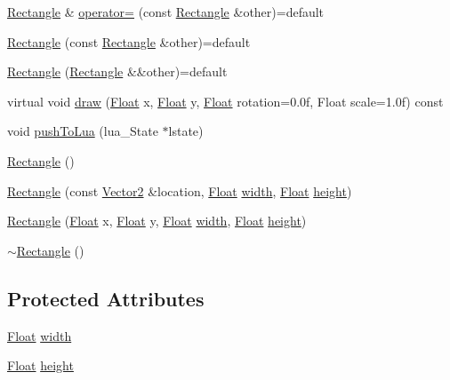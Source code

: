 \begin{DoxyCompactItemize}
\hyperlink{classZeta_1_1Rectangle}{Rectangle} \& \hyperlink{classZeta_1_1Rectangle_a8f621ef5572f32caaaf564f5557e6085}{operator=} (const \hyperlink{classZeta_1_1Rectangle}{Rectangle} \&other)=default
\item 
\hyperlink{classZeta_1_1Rectangle_a6534ea87af2bfb9a8200baeae4701e25}{Rectangle} (const \hyperlink{classZeta_1_1Rectangle}{Rectangle} \&other)=default
\item 
\hyperlink{classZeta_1_1Rectangle_a3da14f013b2eb447d9edfeb259d597bb}{Rectangle} (\hyperlink{classZeta_1_1Rectangle}{Rectangle} \&\&other)=default
\item 
virtual void \hyperlink{classZeta_1_1Rectangle_a2ed6e665e3fd875143cf6bdad95277bb}{draw} (\hyperlink{namespaceZeta_a1e0a1265f9b3bd3075fb0fabd39088ba}{Float} x, \hyperlink{namespaceZeta_a1e0a1265f9b3bd3075fb0fabd39088ba}{Float} y, \hyperlink{namespaceZeta_a1e0a1265f9b3bd3075fb0fabd39088ba}{Float} rotation=0.\+0f, Float scale=1.\+0f) const 
\item 
void \hyperlink{classZeta_1_1Rectangle_ac890285bf9b61bd9a55486743c7f8474}{push\+To\+Lua} (lua\+\_\+\+State $\ast$lstate)
\item 
\hyperlink{classZeta_1_1Rectangle_a809e8853350dd461924d8128b527418e}{Rectangle} ()
\item 
\hyperlink{classZeta_1_1Rectangle_ad44726d525575ad1af0dac91222f6317}{Rectangle} (const \hyperlink{classZeta_1_1Vector2}{Vector2} \&location, \hyperlink{namespaceZeta_a1e0a1265f9b3bd3075fb0fabd39088ba}{Float} \hyperlink{classZeta_1_1Rectangle_a1d564c934b684c156de3fe425ac42e74}{width}, \hyperlink{namespaceZeta_a1e0a1265f9b3bd3075fb0fabd39088ba}{Float} \hyperlink{classZeta_1_1Rectangle_a640f13febc3856b9c4a0729a3aeec1a8}{height})
\item 
\hyperlink{classZeta_1_1Rectangle_a4a0abfaed61c28d07dbf20dcda9c3346}{Rectangle} (\hyperlink{namespaceZeta_a1e0a1265f9b3bd3075fb0fabd39088ba}{Float} x, \hyperlink{namespaceZeta_a1e0a1265f9b3bd3075fb0fabd39088ba}{Float} y, \hyperlink{namespaceZeta_a1e0a1265f9b3bd3075fb0fabd39088ba}{Float} \hyperlink{classZeta_1_1Rectangle_a1d564c934b684c156de3fe425ac42e74}{width}, \hyperlink{namespaceZeta_a1e0a1265f9b3bd3075fb0fabd39088ba}{Float} \hyperlink{classZeta_1_1Rectangle_a640f13febc3856b9c4a0729a3aeec1a8}{height})
\item 
\hyperlink{classZeta_1_1Rectangle_a88af684a512b1b4a6e5b1b2815f160a3}{$\sim$\+Rectangle} ()
\end{DoxyCompactItemize}
\subsection*{Protected Attributes}
\begin{DoxyCompactItemize}
\item 
\hyperlink{namespaceZeta_a1e0a1265f9b3bd3075fb0fabd39088ba}{Float} \hyperlink{classZeta_1_1Rectangle_a1d564c934b684c156de3fe425ac42e74}{width}
\item 
\hyperlink{namespaceZeta_a1e0a1265f9b3bd3075fb0fabd39088ba}{Float} \hyperlink{classZeta_1_1Rectangle_a640f13febc3856b9c4a0729a3aeec1a8}{height}
\end{DoxyCompactItemize}


